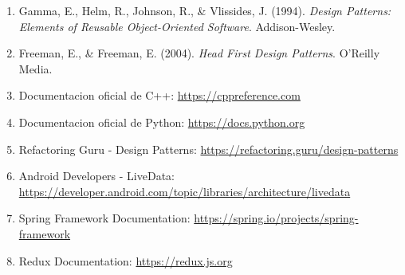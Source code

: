 \documentclass[11pt,a4paper]{article}
\begin{document}
\begin{enumerate}
    \item Gamma, E., Helm, R., Johnson, R., \& Vlissides, J. (1994). \textit{Design Patterns: Elements of Reusable Object-Oriented Software}. Addison-Wesley.
    
    \item Freeman, E., \& Freeman, E. (2004). \textit{Head First Design Patterns}. O'Reilly Media.
    
    \item Documentacion oficial de C++: \url{https://cppreference.com}
    
    \item Documentacion oficial de Python: \url{https://docs.python.org}
    
    \item Refactoring Guru - Design Patterns: \url{https://refactoring.guru/design-patterns}
    
    \item Android Developers - LiveData: \url{https://developer.android.com/topic/libraries/architecture/livedata}
    
    \item Spring Framework Documentation: \url{https://spring.io/projects/spring-framework}
    
    \item Redux Documentation: \url{https://redux.js.org}
\end{enumerate}
\end{document}
